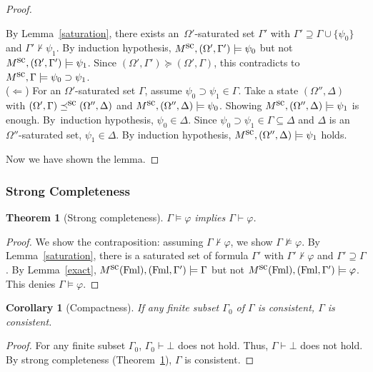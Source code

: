 \documentclass[doctor]{iscs-thesis}
\newcommand{\fml}{\operatorname{Fml}}
\newtheorem{corollary}{Corollary}
\newtheorem{theorem}{Theorem}
\begin{document}
\begin{proof}
\begin{description}
	    By Lemma~\ref{saturation}, there exists an~$\Omega'$-saturated
	    set $\Gamma'$ with
	    $\Gamma'\supseteq \Gamma\cup \{\psi_0\}$ and $\Gamma'\not\vdash\psi_1$.
	    By induction hypothesis, $M^{\mbox{sc}}, (\Omega',\Gamma')\models \psi_0$ but not
	    $M^{\mbox{sc}}, (\Omega',\Gamma')\models \psi_1$.
	    Since $(\Omega',\Gamma')\succeq(\Omega',\Gamma)$,
	    this contradicts to $M^{\mbox{sc}}, \Gamma\models \psi_0\supset\psi_1$.\\
	    ($\Leftarrow$)
	    For an $\Omega'$-saturated set $\Gamma$\kern -1pt,
	    assume $\psi_0\supset \psi_1\in \Gamma$.
	    Take a state $(\Omega'',\Delta)$ with
	    $(\Omega',\Gamma)\preceq^{\mbox{sc}} (\Omega'',\Delta)$ and
	    $M^{\mbox{sc}}, (\Omega'',\Delta)\models \psi_0$.
	    Showing $M^{\mbox{sc}}, (\Omega'',\Delta)\models \psi_1$ is enough.
	    By~induction hypothesis, $\psi_0\in\Delta$.
	    Since $\psi_0\supset \psi_1\in \Gamma\subseteq\Delta$ and $\Delta$ is
	    an~$\Omega''$-saturated set, $\psi_1\in\Delta$.
	    By induction hypothesis, $M^{\mbox{sc}}, (\Omega'',\Delta)\models \psi_1$ holds.
\end{description}
 Now we have shown the lemma.
\end{proof}

\subsubsection{Strong Completeness}

\begin{theorem}[Strong completeness]
 \label{strong-completeness}
 $\Gamma\models\varphi$ implies $\Gamma\vdash\varphi$.
\end{theorem}
\begin{proof}
 We show the contraposition: assuming $\Gamma\not\vdash\varphi$, we show
 $\Gamma\not\models\varphi$.
 By Lemma~\ref{saturation},
 there is a saturated set of formula $\Gamma'$ with $\Gamma'\not\vdash\varphi$
 and $\Gamma'\supseteq\Gamma$.
 By Lemma~\ref{exact},
 $\canon M(\fml), (\fml,\Gamma')\models \Gamma$ but not $\canon M(\fml),
 (\fml,\Gamma') \models \varphi$.
 This denies $\Gamma\models\varphi$. 
\end{proof}

\begin{corollary}[Compactness]
 \label{compactness}
 If any finite subset $\Gamma_0$ of $\Gamma$ is consistent,
 $\Gamma$ is consistent.
\end{corollary}
\begin{proof}
 For any finite subset $\Gamma_0$, $\Gamma_0\vdash\bot$ does not hold.
 Thus, $\Gamma\vdash\bot$ does not hold.
 By strong completeness (Theorem~\ref{strong-completeness}),
 $\Gamma$ is consistent.
\end{proof}
\end{document}
